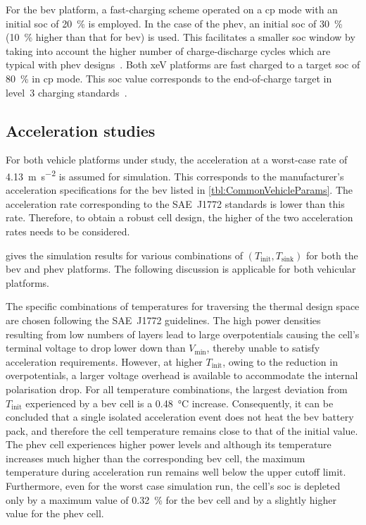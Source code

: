 For the \gls{bev}  platform, a fast-charging scheme operated on  a \gls{cp} mode
with an initial  \gls{soc} of \SI{20}{\percent} is employed. In  the case of the
\gls{phev}, an initial \gls{soc}  of \SI{30}{\percent} (\SI{10}{\percent} higher
than that for \gls{bev}) is used. This facilitates a smaller \gls{soc} window by
taking  into account  the higher  number  of charge-discharge  cycles which  are
typical with \gls{phev}  designs~\cite{Maksimovic2012}. Both \gls{xeV} platforms
are fast  charged to a target  \gls{soc} of \SI{80}{\percent} in  \gls{cp} mode.
This \gls{soc} value corresponds to the end-of-charge target in level~3 charging
standards~\cite{SAECharging2011}.

\subsection{Acceleration studies}

For both vehicle platforms under study, the acceleration at a worst-case rate of
\SI{4.13}{\meter\per\second\squared} is assumed for simulation. This corresponds
to the  manufacturer's acceleration specifications  for the \gls{bev}  listed in
\cref{tbl:CommonVehicleParams}.  The  acceleration  rate  corresponding  to  the
SAE~J1772 standards is lower than this  rate. Therefore, to obtain a robust cell
design, the higher of the two acceleration rates needs to be considered.

  gives the  simulation  results  for various  combinations
of  $(T_\text{init},  T_\text{sink})$  for  both the  \gls{bev}  and  \gls{phev}
platforms. The following discussion is applicable for both vehicular platforms.



The  specific combinations  of temperatures  for traversing  the thermal  design
space are  chosen following the  SAE~J1772 guidelines. The high  power densities
resulting from  low numbers of layers  lead to large overpotentials  causing the
cell's terminal voltage  to drop lower down than  $V_\text{min}$, thereby unable
to satisfy acceleration requirements.  However, at higher $T_\text{init}$, owing
to the  reduction in overpotentials, a  larger voltage overhead is  available to
accommodate the  internal polarisation  drop. For all  temperature combinations,
the largest deviation from $T_\text{init}$ experienced  by a \gls{bev} cell is a
\SI{0.48}{\degreeCelsius}  increase. Consequently,  it can  be concluded  that a
single isolated acceleration event does not heat the \gls{bev} battery pack, and
therefore the cell  temperature remains close to that of  the initial value. The
\gls{phev} cell  experiences higher  power levels  and although  its temperature
increases  much  higher  than  the corresponding  \gls{bev}  cell,  the  maximum
temperature during acceleration  run remains well below the  upper cutoff limit.
Furthermore, even  for the worst  case simulation  run, the cell's  \gls{soc} is
depleted only by  a maximum value of \SI{0.32}{\percent} for  the \gls{bev} cell
and by a slightly higher value for the \gls{phev} cell.

